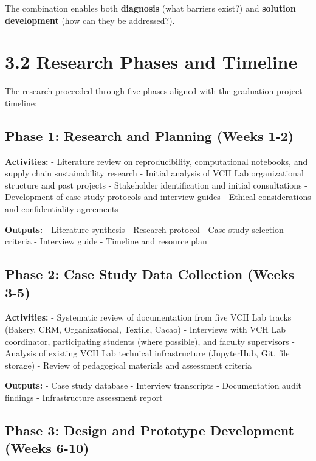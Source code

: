 \documentclass[
  oneside,
  open=any]{scrbook}
\begin{document}
The combination enables both \textbf{diagnosis} (what barriers exist?)
and \textbf{solution development} (how can they be addressed?).

\section{3.2 Research Phases and
Timeline}\label{research-phases-and-timeline}

The research proceeded through five phases aligned with the graduation
project timeline:

\subsection{Phase 1: Research and Planning (Weeks
1-2)}\label{phase-1-research-and-planning-weeks-1-2}

\textbf{Activities:} - Literature review on reproducibility,
computational notebooks, and supply chain sustainability research -
Initial analysis of VCH Lab organizational structure and past projects -
Stakeholder identification and initial consultations - Development of
case study protocols and interview guides - Ethical considerations and
confidentiality agreements

\textbf{Outputs:} - Literature synthesis - Research protocol - Case
study selection criteria - Interview guide - Timeline and resource plan

\subsection{Phase 2: Case Study Data Collection (Weeks
3-5)}\label{phase-2-case-study-data-collection-weeks-3-5}

\textbf{Activities:} - Systematic review of documentation from five VCH
Lab tracks (Bakery, CRM, Organizational, Textile, Cacao) - Interviews
with VCH Lab coordinator, participating students (where possible), and
faculty supervisors - Analysis of existing VCH Lab technical
infrastructure (JupyterHub, Git, file storage) - Review of pedagogical
materials and assessment criteria

\textbf{Outputs:} - Case study database - Interview transcripts -
Documentation audit findings - Infrastructure assessment report

\subsection{Phase 3: Design and Prototype Development (Weeks
6-10)}\label{phase-3-design-and-prototype-development-weeks-6-10}
\end{document}
